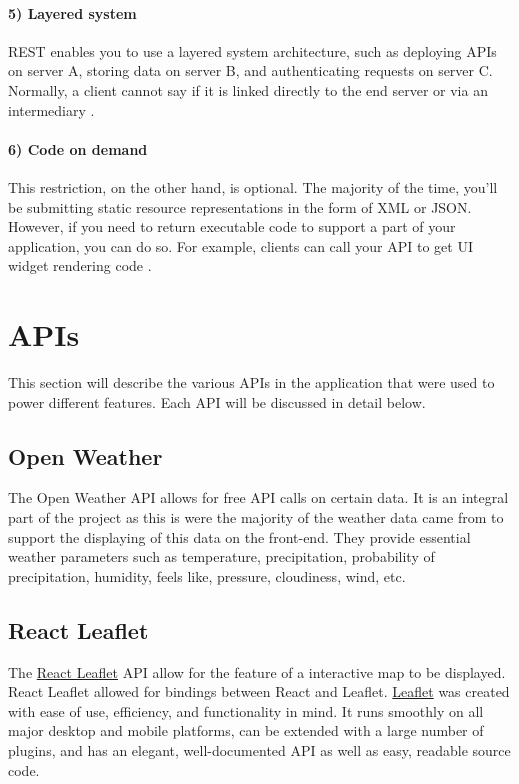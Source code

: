 \paragraph{5) Layered system}
REST enables you to use a layered system architecture, such as deploying APIs on server A, storing data on server B, and authenticating requests on server C. Normally, a client cannot say if it is linked directly to the end server or via an intermediary \cite{REST}.
\paragraph{6) Code on demand}
This restriction, on the other hand, is optional. The majority of the time, you'll be submitting static resource representations in the form of XML or JSON. However, if you need to return executable code to support a part of your application, you can do so. For example, clients can call your API to get UI widget rendering code \cite{REST}.


\section{APIs}

This section will describe the various APIs in the application that were used to power different features. Each API will be discussed in detail below.

\subsection{Open Weather}
The Open Weather API allows for free API calls on certain data. It is an integral part of the project as this is were the majority of the weather data came from to support the displaying of this data on the front-end. They provide essential weather parameters such as temperature, precipitation, probability of precipitation, humidity, feels like, pressure, cloudiness, wind, etc. 
\subsection{React Leaflet}
The \href{https://react-leaflet.js.org/docs/start-introduction}{React Leaflet} API allow for the feature of a interactive map to be displayed. React Leaflet allowed for bindings between React and Leaflet. \href{https://leafletjs.com/}{Leaflet} was created with ease of use, efficiency, and functionality in mind. It runs smoothly on all major desktop and mobile platforms, can be extended with a large number of plugins, and has an elegant, well-documented API as well as easy, readable source code.

